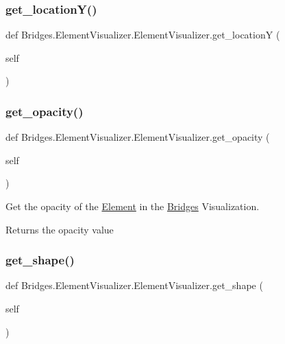 \subsubsection{\texorpdfstring{get\+\_\+location\+Y()}{get\_locationY()}}
{\footnotesize\ttfamily def Bridges.\+Element\+Visualizer.\+Element\+Visualizer.\+get\+\_\+locationY (\begin{DoxyParamCaption}\item[{}]{self }\end{DoxyParamCaption})}

\mbox{\label{class_bridges_1_1_element_visualizer_1_1_element_visualizer_a54a58179a82e3d571069f2918114ce9e}} 
\subsubsection{\texorpdfstring{get\+\_\+opacity()}{get\_opacity()}}
{\footnotesize\ttfamily def Bridges.\+Element\+Visualizer.\+Element\+Visualizer.\+get\+\_\+opacity (\begin{DoxyParamCaption}\item[{}]{self }\end{DoxyParamCaption})}



Get the opacity of the \mbox{\hyperlink{namespace_bridges_1_1_element}{Element}} in the \mbox{\hyperlink{namespace_bridges_1_1_bridges}{Bridges}} Visualization. 

\begin{DoxyReturn}{Returns}
the opacity value 
\end{DoxyReturn}
\mbox{\label{class_bridges_1_1_element_visualizer_1_1_element_visualizer_aa1fe7978af156f5a2a2cad15eda02287}} 
\subsubsection{\texorpdfstring{get\+\_\+shape()}{get\_shape()}}
{\footnotesize\ttfamily def Bridges.\+Element\+Visualizer.\+Element\+Visualizer.\+get\+\_\+shape (\begin{DoxyParamCaption}\item[{}]{self }\end{DoxyParamCaption})}



